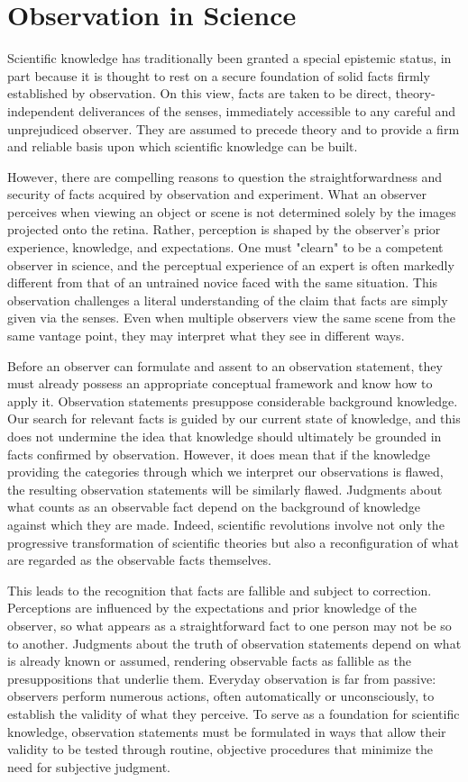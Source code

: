 %
%
\section{Observation in Science}

Scientific knowledge has traditionally been granted a special epistemic status, in part because it is thought to rest on a secure foundation of solid facts firmly established by observation. On this view, facts are taken to be direct, theory-independent deliverances of the senses, immediately accessible to any careful and unprejudiced observer. They are assumed to precede theory and to provide a firm and reliable basis upon which scientific knowledge can be built.

However, there are compelling reasons to question the straightforwardness and security of facts acquired by observation and experiment. What an observer perceives when viewing an object or scene is not determined solely by the images projected onto the retina. Rather, perception is shaped by the observer’s prior experience, knowledge, and expectations. One must "clearn" to be a competent observer in science, and the perceptual experience of an expert is often markedly different from that of an untrained novice faced with the same situation. This observation challenges a literal understanding of the claim that facts are simply given via the senses. Even when multiple observers view the same scene from the same vantage point, they may interpret what they see in different ways.

Before an observer can formulate and assent to an observation statement, they must already possess an appropriate conceptual framework and know how to apply it. Observation statements presuppose considerable background knowledge. Our search for relevant facts is guided by our current state of knowledge, and this does not undermine the idea that knowledge should ultimately be grounded in facts confirmed by observation. However, it does mean that if the knowledge providing the categories through which we interpret our observations is flawed, the resulting observation statements will be similarly flawed. Judgments about what counts as an observable fact depend on the background of knowledge against which they are made. Indeed, scientific revolutions involve not only the progressive transformation of scientific theories but also a reconfiguration of what are regarded as the observable facts themselves.

This leads to the recognition that facts are fallible and subject to correction. Perceptions are influenced by the expectations and prior knowledge of the observer, so what appears as a straightforward fact to one person may not be so to another. Judgments about the truth of observation statements depend on what is already known or assumed, rendering observable facts as fallible as the presuppositions that underlie them. Everyday observation is far from passive: observers perform numerous actions, often automatically or unconsciously, to establish the validity of what they perceive. To serve as a foundation for scientific knowledge, observation statements must be formulated in ways that allow their validity to be tested through routine, objective procedures that minimize the need for subjective judgment.

